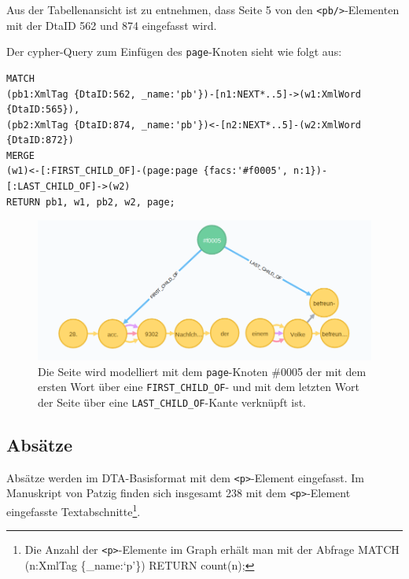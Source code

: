 \documentclass[ngerman,]{scrreprt}
\begin{document}
Aus der Tabellenansicht ist zu entnehmen, dass Seite 5 von den \texttt{\textless{}pb/\textgreater{}}-Elementen mit der DtaID 562 und 874 eingefasst wird.

Der cypher-Query zum Einfügen des \texttt{page}-Knoten sieht wie folgt aus:

\begin{verbatim}
MATCH
(pb1:XmlTag {DtaID:562, _name:'pb'})-[n1:NEXT*..5]->(w1:XmlWord {DtaID:565}),
(pb2:XmlTag {DtaID:874, _name:'pb'})<-[n2:NEXT*..5]-(w2:XmlWord {DtaID:872})
MERGE
(w1)<-[:FIRST_CHILD_OF]-(page:page {facs:'#f0005', n:1})-[:LAST_CHILD_OF]->(w2)
RETURN pb1, w1, pb2, w2, page;
\end{verbatim}

\begin{figure}
\centering
\includegraphics{Bilder/TEI2Graph/page-f0005.png}
\caption[Die Seite wird modelliert mit dem \texttt{page}-Knoten \#0005 der mit dem ersten Wort über eine \texttt{FIRST\_CHILD\_OF}- und mit dem letzten Wort der Seite über eine \texttt{LAST\_CHILD\_OF}-Kante verknüpft ist.]{Die Seite wird modelliert mit dem \texttt{page}-Knoten \#0005 der mit dem ersten Wort über eine \texttt{FIRST\_CHILD\_OF}- und mit dem letzten Wort der Seite über eine \texttt{LAST\_CHILD\_OF}-Kante verknüpft ist.\footnotemark{}}
\end{figure}

\subsection{Absätze}\label{absuxe4tze}

Absätze werden im DTA-Basisformat mit dem \texttt{\textless{}p\textgreater{}}-Element eingefasst. Im Manuskript von Patzig finden sich insgesamt 238 mit dem \texttt{\textless{}p\textgreater{}}-Element eingefasste Textabschnitte\footnote{Die Anzahl der \texttt{\textless{}p\textgreater{}}-Elemente im Graph erhält man mit der Abfrage MATCH (n:XmlTag \{\_name:`p'\}) RETURN count(n);}.
\end{document}
